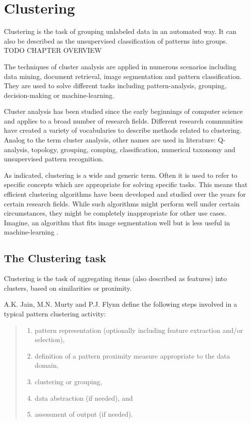 \section{Clustering}

Clustering is the task of grouping unlabeled data in an automated way. It can also be described as the unsupervised classification of patterns into groups. TODO CHAPTER OVERVIEW

The techniques of cluster analysis are applied in numerous scenarios including data mining, document retrieval, image segmentation and pattern classification. They are used to solve different tasks including pattern-analysis, grouping, decision-making or machine-learning.

Cluster analysis has been studied since the early beginnings of computer science and applies to a broad number of research fields. Different research communities have created a variety of vocabularies to describe methods related to clustering. Analog to the term cluster analysis, other names are used in literature: Q-analysis, topology, grouping, comping, classification, numerical taxonomy and unsupervised pattern recognition.

As indicated, clustering is a wide and generic term. Often it is used to refer to specific concepts which are appropriate for solving specific tasks. This means that efficient clustering algorithms have been developed and studied over the years for certain research fields. While such algorithms might perform well under certain circumstances, they might be completely inappropriate for other use cases. Imagine, an algorithm that  fits image segmentation well but is less useful in machine-learning \cite{Meert06clustermaps, Jain99clusterreview}. 


\subsection{The Clustering task}

Clustering is the task of aggregating items (also described as features) into clusters, based on similarities or proximity.

A.K. Jain, M.N. Murty and P.J. Flynn \cite{Jain99clusterreview} define the following steps involved in a typical pattern clustering activity:
 
\begin{quote}
\begin{enumerate}
\item pattern representation (optionally including feature extraction and/or selection), 
\item definition of a pattern proximity measure appropriate to the data domain, 
\item clustering or grouping, 
\item data abstraction (if needed), and 
\item assessment of output (if needed). 
\end{enumerate}
\end{quote}

